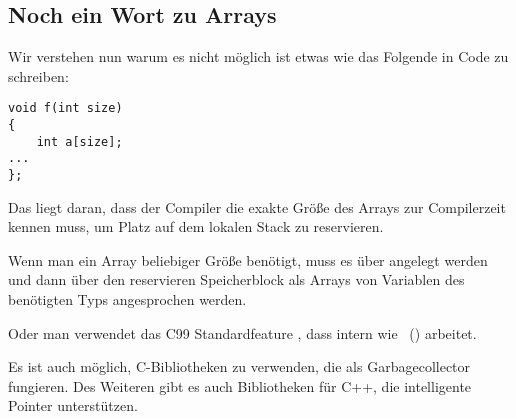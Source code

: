 \subsection{Noch ein Wort zu Arrays}
Wir verstehen nun warum es nicht möglich ist etwas wie das Folgende in \CCpp Code zu schreiben:

\begin{lstlisting}[style=customc]
void f(int size)
{
    int a[size];
...
};
\end{lstlisting}
Das liegt daran, dass der Compiler die exakte Größe des Arrays zur Compilerzeit kennen muss, um Platz auf dem lokalen
Stack zu reservieren.

Wenn man ein Array beliebiger Größe benötigt, muss es über  angelegt werden und dann über den reservieren
Speicherblock als Arrays von Variablen des benötigten Typs angesprochen werden.

Oder man verwendet das C99 Standardfeature , dass intern wie
~() arbeitet.

Es ist auch möglich, C-Bibliotheken zu verwenden, die als Garbagecollector fungieren.
Des Weiteren gibt es auch Bibliotheken für C++, die intelligente Pointer unterstützen.